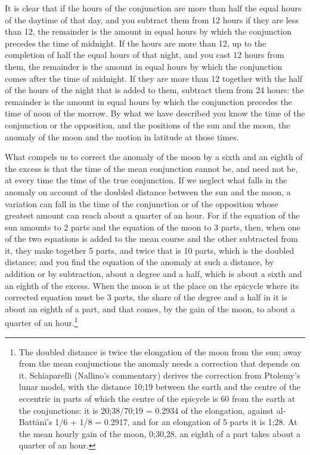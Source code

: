 \documentclass[11pt]{article}
\newcommand{\ArPage}[1]{\marginpar{\footnotesize\color{gray}Ar.\,p.\,#1}}
\begin{document}
\par \ArPage{144}It is clear that if the hours of the conjunction are more than half the equal hours of the daytime of that day, and you subtract them from 12 hours if they are less than 12, the remainder is the amount in equal hours by which the conjunction precedes the time of midnight. If the hours are more than 12, up to the completion of half the equal hours of that night, and you cast 12 hours from them, the remainder is the amount in equal hours by which the conjunction comes after the time of midnight. If they are more than 12 together with the half of the hours of the night that is added to them, subtract them from 24 hours: the remainder is the amount in equal hours by which the conjunction precedes the time of noon of the morrow. By what we have described you know the time of the conjunction or the opposition, and the positions of the sun and the moon, the anomaly of the moon and the motion in latitude at those times.\par
\par What compels us to correct the anomaly of the moon by a sixth and an eighth of the excess is that the time of the mean conjunction cannot be, and need not be, at every time the time of the true conjunction. If we neglect what falls in the anomaly on account of the doubled distance between the sun and the moon, a variation can fall in the time of the conjunction or of the opposition whose greatest amount can reach about a quarter of an hour. For if the equation of the sun amounts to 2 parts and the equation of the moon to 3 parts, then, when one of the two equations is added to the mean course and the other subtracted from it, they make together 5 parts, and twice that is 10 parts, which is the doubled distance; and you find the equation of the anomaly at such a distance, by addition or by subtraction, about a degree and a half, which is about a sixth and an eighth of the excess. When the moon is at the place on the epicycle where its corrected equation must be 3 parts, the share of the degree and a half in it is about an eighth of a part, and that comes, by the gain of the moon, to about a quarter of an hour.\footnote{The doubled distance is twice the elongation of the moon from the sun; away from the mean conjunctions the anomaly needs a correction that depends on it. Schiaparelli (Nallino's commentary) derives the correction from Ptolemy's lunar model, with the distance 10;19 between the earth and the centre of the eccentric in parts of which the centre of the epicycle is 60 from the earth at the conjunctions: it is 20;38/70;19 = 0.2934 of the elongation, against al-Battānī's 1/6 + 1/8 = 0.2917, and for an elongation of 5 parts it is 1;28. At the mean hourly gain of the moon, 0;30,28, an eighth of a part takes about a quarter of an hour.}\par
\end{document}
